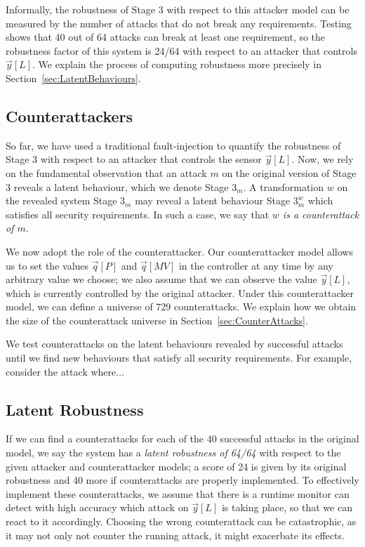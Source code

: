 Informally, the robustness of Stage 3 with respect to this attacker model can be measured by the number of attacks that do not break any requirements. Testing shows that 40 out of 64 attacks can break at least one requirement, so the robustness factor of this system is 24/64 with respect to an attacker that controls $\vec{y}[L]$. We explain the process of computing robustness more precisely in Section~\ref{sec:LatentBehaviours}.

\subsection*{Counterattackers}
So far, we have used a traditional fault-injection to quantify the robustness of Stage 3 with respect to an attacker that controls the sensor $\vec{y}[L]$. 
Now, we rely on the fundamental observation that an attack $m$ on the original version of Stage 3 reveals a latent behaviour, which we denote Stage $3_m$. 
A transformation $w$ on the revealed system Stage $3_m$ may reveal a latent behaviour Stage $3^w_m$ which satisfies all security requirements. 
In such a case, we say that \emph{$w$ is a counterattack of $m$}.

We now adopt the role of the counterattacker. Our counterattacker model allows us to set the values $\vec{q}[P]$ and $\vec{q}[MV]$ in the controller at any time by any arbitrary value we choose; we also assume that we can observe the value $\vec{y}[L]$, which is currently controlled by the original attacker. Under this counterattacker model, we can define a universe of 729 counterattacks. We explain how we obtain the size of the counterattack universe in Section~\ref{sec:CounterAttacks}.

We test counterattacks on the latent behaviours revealed by successful attacks until we find new behaviours that satisfy all security requirements. For example, consider the attack where...

\subsection*{Latent Robustness}
If we can find a counterattacks for each of the 40 successful attacks in the original model, we say the system has a \emph{latent robustness of 64/64} with respect to the given attacker and counterattacker models; a score of 24 is given by its original robustness and 40 more if counterattacks are properly implemented. To effectively implement these counterattacks, we assume that there is a runtime monitor can detect with high accuracy which attack on $\vec{y}[L]$ is taking place, so that we can react to it accordingly. Choosing the wrong counterattack can be catastrophic, as it may not only not counter the running attack, it might exacerbate its effects.

